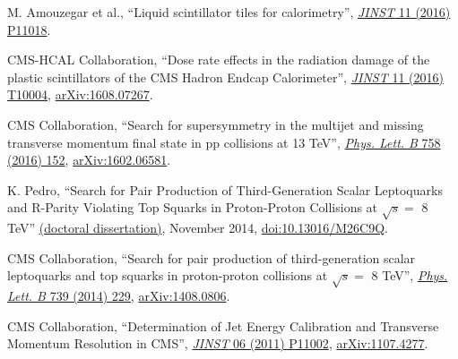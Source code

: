 \begin{nbdescription}[leftmargin=12pt,font=\normalfont,labelsep=0em]
\item M. Amouzegar et al., ``Liquid scintillator tiles for calorimetry'', \href{http://dx.doi.org/10.1088/1748-0221/11/11/P11018}{\emph{JINST} 11 (2016) P11018}. %
\item CMS-HCAL Collaboration, ``Dose rate effects in the radiation damage of the plastic scintillators of the CMS Hadron Endcap Calorimeter'', \href{http://dx.doi.org/10.1088/1748-0221/11/10/T10004}{\emph{JINST} 11 (2016) T10004}, \href{http://arxiv.org/abs/1608.07267}{arXiv:1608.07267}. %
\item CMS Collaboration, ``Search for supersymmetry in the multijet and missing transverse momentum final state in pp collisions at 13 TeV'', \href{http://dx.doi.org/10.1016/j.physletb.2016.05.002}{\emph{Phys. Lett. B} 758 (2016) 152}, \href{http://arxiv.org/abs/1602.06581}{arXiv:1602.06581}. %
\item K. Pedro, ``Search for Pair Production of Third-Generation Scalar Leptoquarks and R-Parity Violating Top Squarks in Proton-Proton Collisions at $\sqrt{s} =$ 8 TeV'' \href{http://cds.cern.ch/record/1968611}{(doctoral dissertation)}, November 2014, \href{https://doi.org/10.13016/M26C9Q}{doi:10.13016/M26C9Q}. %
\item CMS Collaboration, ``Search for pair production of third-generation scalar leptoquarks and top squarks in proton-proton collisions at $\sqrt{s} =$ 8 TeV'', \href{http://dx.doi.org/10.1016/j.physletb.2014.10.063}{\emph{Phys. Lett. B} 739 (2014) 229}, \href{http://arxiv.org/abs/1408.0806}{arXiv:1408.0806}. %
\item CMS Collaboration, ``Determination of Jet Energy Calibration and Transverse Momentum Resolution in CMS'', \href{http://dx.doi.org/10.1088/1748-0221/6/11/P11002}{\emph{JINST} 06 (2011) P11002}, \href{http://arxiv.org/abs/1107.4277}{arXiv:1107.4277}. %
\end{nbdescription}

